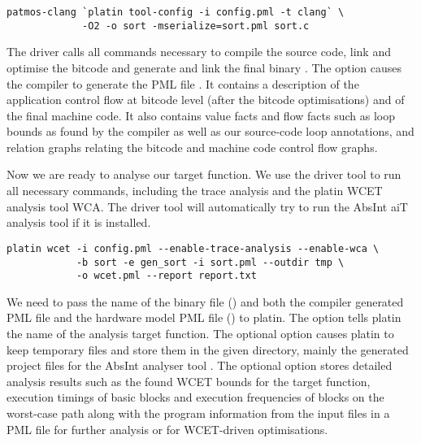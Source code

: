 \begin{verbatim}
patmos-clang `platin tool-config -i config.pml -t clang` \
             -O2 -o sort -mserialize=sort.pml sort.c
\end{verbatim}

The driver calls all commands necessary to compile the source code, link and optimise the bitcode and generate
and link the final binary \code{sort}. The option \code{-mserialize} causes the compiler to
generate the PML file \code{sort.pml}. It contains a description of the application control flow at bitcode
level (after the bitcode optimisations) and of the final machine code. It also contains value facts and flow facts
such as loop bounds as found by the compiler as well as our source-code loop annotations, and relation graphs
relating the bitcode and machine code control flow graphs.

Now we are ready to analyse our target function. We use the  driver tool to run all
necessary commands, including the trace analysis and the platin WCET analysis tool WCA. The driver tool
will automatically try to run the AbsInt aiT analysis tool if it is installed.

\begin{verbatim}
platin wcet -i config.pml --enable-trace-analysis --enable-wca \
            -b sort -e gen_sort -i sort.pml --outdir tmp \
            -o wcet.pml --report report.txt
\end{verbatim}

We need to pass the name of the binary file () and both the compiler generated PML file and the
hardware model PML file () to platin. The  option tells platin the name of the analysis
target function. The optional  option causes platin to keep temporary files and store them in
the given directory, mainly the generated project files for the AbsInt analyser tool \code{a3patmos}.
The optional \code{-o} option stores detailed analysis results such as the found WCET bounds for the
target function, execution timings of basic blocks and execution frequencies of blocks on the worst-case path
along with the program information from the input files in a PML file for further analysis or for WCET-driven
optimisations.




